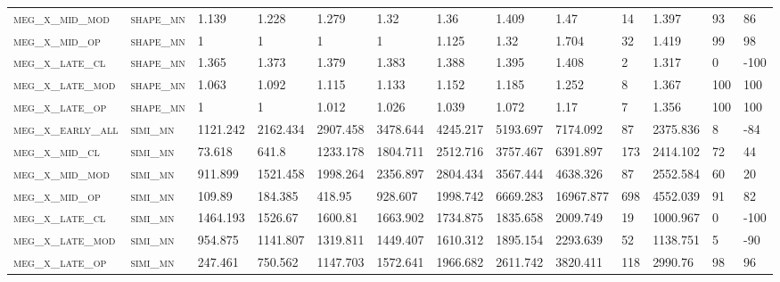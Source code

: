 \begin{landscape}
\begin{center}
\begin{footnotesize}
\begin{longtable}{lllllllllllll}
\textsc{meg\_x\_mid\_mod  } & \textsc{shape\_mn }   & 1.139    & 1.228    & 1.279    & 1.32     & 1.36     & 1.409    & 1.47      & 14     & 1.397         & 93            & 86            \\
\textsc{meg\_x\_mid\_op   } & \textsc{shape\_mn }   & 1        & 1        & 1        & 1        & 1.125    & 1.32     & 1.704     & 32     & 1.419         & 99            & 98            \\
\textsc{meg\_x\_late\_cl  } & \textsc{shape\_mn }   & 1.365    & 1.373    & 1.379    & 1.383    & 1.388    & 1.395    & 1.408     & 2      & 1.317         & 0             & -100          \\
\textsc{meg\_x\_late\_mod } & \textsc{shape\_mn }   & 1.063    & 1.092    & 1.115    & 1.133    & 1.152    & 1.185    & 1.252     & 8      & 1.367         & 100           & 100           \\
\textsc{meg\_x\_late\_op  } & \textsc{shape\_mn }   & 1        & 1        & 1.012    & 1.026    & 1.039    & 1.072    & 1.17      & 7      & 1.356         & 100           & 100           \\
\textsc{meg\_x\_early\_all} & \textsc{simi\_mn  }   & 1121.242 & 2162.434 & 2907.458 & 3478.644 & 4245.217 & 5193.697 & 7174.092  & 87     & 2375.836      & 8             & -84           \\
\textsc{meg\_x\_mid\_cl   } & \textsc{simi\_mn  }   & 73.618   & 641.8    & 1233.178 & 1804.711 & 2512.716 & 3757.467 & 6391.897  & 173    & 2414.102      & 72            & 44            \\
\textsc{meg\_x\_mid\_mod  } & \textsc{simi\_mn  }   & 911.899  & 1521.458 & 1998.264 & 2356.897 & 2804.434 & 3567.444 & 4638.326  & 87     & 2552.584      & 60            & 20            \\
\textsc{meg\_x\_mid\_op   } & \textsc{simi\_mn  }   & 109.89   & 184.385  & 418.95   & 928.607  & 1998.742 & 6669.283 & 16967.877 & 698    & 4552.039      & 91            & 82            \\
\textsc{meg\_x\_late\_cl  } & \textsc{simi\_mn  }   & 1464.193 & 1526.67  & 1600.81  & 1663.902 & 1734.875 & 1835.658 & 2009.749  & 19     & 1000.967      & 0             & -100          \\
\textsc{meg\_x\_late\_mod } & \textsc{simi\_mn  }   & 954.875  & 1141.807 & 1319.811 & 1449.407 & 1610.312 & 1895.154 & 2293.639  & 52     & 1138.751      & 5             & -90           \\
\textsc{meg\_x\_late\_op  } & \textsc{simi\_mn  }   & 247.461  & 750.562  & 1147.703 & 1572.641 & 1966.682 & 2611.742 & 3820.411  & 118    & 2990.76       & 98            & 96            \\%


\end{longtable}
\end{footnotesize}
\end{center}
\end{landscape}

